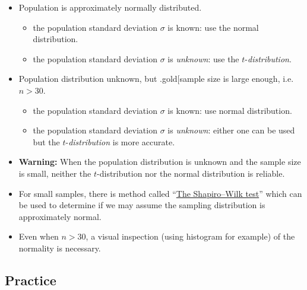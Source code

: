 \begin{itemize}
\item
  Population is approximately normally distributed.

  \begin{itemize}
  \item
    the population standard deviation \(\sigma\) is known:
    use the normal distribution.
  \item
    the population standard deviation \(\sigma\) is
    \emph{unknown}: use the
    \(t\)-\emph{distribution}.
  \end{itemize}
\item
  Population distribution unknown, but .gold{[}sample size is large
  enough, i.e.~\(n>30\).

  \begin{itemize}
  \item
    the population standard deviation \(\sigma\) is known:
    use normal distribution.
  \item
    the population standard deviation \(\sigma\) is
    \emph{unknown}: either one can be used but the
    \(t\)-\emph{distribution} is more accurate.
  \end{itemize}
\item
  \textbf{Warning:} When the population distribution is unknown and the
  sample size is small, neither the \(t\)-distribution nor the
  normal distribution is reliable.
\item
  For small samples, there is method called
  ``\href{http://www.sthda.com/english/wiki/normality-test-in-r\#normality-test}{The
  Shapiro--Wilk test}'' which can be used to determine if we may assume
  the sampling distribution is approximately normal.
\item
  Even when \(n>30\), a visual inspection (using histogram for example)
  of the normality is necessary.
\end{itemize}

\hypertarget{practice}{%
\subsection{Practice}\label{practice}}

